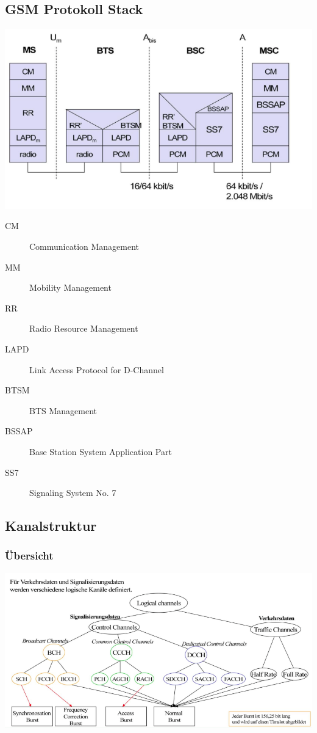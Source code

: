 \subsection{GSM Protokoll Stack}
\begin{minipage}{0.5 \linewidth}
\includegraphics[width = \linewidth]{./Pics/GSMProtokollStack}
\end{minipage}
\begin{minipage}{0.5 \linewidth}
\begin{description}
\item[CM] Communication Management
\item[MM] Mobility Management
\item[RR] Radio Resource Management
\item[LAPD] Link Access Protocol for D-Channel
\item[BTSM] BTS Management
\item[BSSAP] Base Station System Application Part
\item[SS7] Signaling System No. 7
\end{description}
\end{minipage}

\subsection{Kanalstruktur}
\subsubsection{Übersicht}
\includegraphics[width = 0.5 \linewidth]{./Pics/GSMKanalstruktur}

